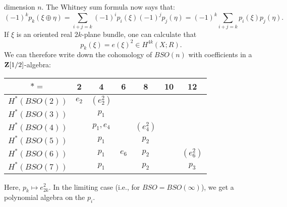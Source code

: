dimension $n$. The Whitney sum formula now says that:
$$
(-1)^k p_k(\xi\oplus\eta) = \sum_{i+j = k}(-1)^i p_i(\xi) (-1)^j p_j(\eta) =
(-1)^k\sum_{i+j=k}p_i(\xi)p_j(\eta).
$$
If $\xi$ is an oriented real $2k$-plane bundle, one can calculate that
$$
p_k(\xi) = e(\xi)^2\in H^{4k}(X;R).
$$
We can therefore write down the cohomology of $BSO(n)$ with coefficients in a
$\mathbf Z[1/2]$-algebra:
\begin{center}
    \begin{tabular}{ c|c c c c c c} 
	\hline
	$\ast = $ & 2 & 4 & 6 & 8 & 10 & 12\\
	\hline
	$H^\ast(BSO(2))$ & $e_2$ & $(e_2^2)$ & & & &\\
	$H^\ast(BSO(3))$ & & $p_1$ & & & &\\
	$H^\ast(BSO(4))$ & & $p_1,e_4$ & & $(e_4^2)$ & &\\
	$H^\ast(BSO(5))$ & & $p_1$ & & $p_2$ & &\\
	$H^\ast(BSO(6))$ & & $p_1$ & $e_6$ & $p_2$ & & $(e_6^2)$\\
	$H^\ast(BSO(7))$ & & $p_1$ & & $p_2$ & & $p_3$
    \end{tabular}
\end{center}
Here, $p_k \mapsto e_{2k}^2$. In the limiting case (i.e., for $BSO =
BSO(\infty)$), we get a polynomial algebra on the $p_i$.
